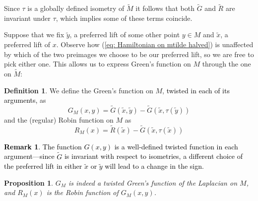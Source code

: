 \documentclass[11pt,twoside]{article}
\newtheorem{prop}[theorem]{Proposition}
\theoremstyle{definition}
\newtheorem{Def}[theorem]{Definition}
\newtheorem{rem}[theorem]{Remark}
\numberwithin{equation}{section}
\def\Mt{\widetilde{M}}
\def\Gt{\widetilde{G}}
\def\Rt{\widetilde{R}}
\def\xt{\tilde{x}}
\def\yt{\tilde{y}}
\begin{document}
Since $\tau$ is a globally defined isometry of $\Mt$ it follows that both $\Gt$ and $\Rt$ are invariant under $\tau$, which implies some of these terms coincide.

Suppose that we fix $\yt$, a preferred lift of some other  point $y\in M$ and $\xt$, a preferred lift of $x$. Observe how (\ref{eq: Hamiltonian on mtilde halved}) is unaffected by which of the two preimages we choose to be our preferred lift, so we are free to pick either one. This allows us to express Green's function on $M$ through the one on $\Mt$:
\begin{Def}
We define the Green's function on $M$, \textcolor{black}{twisted in each of its arguments,} as 
\begin{equation}
\label{eq: twisted Green}
G_M(x,y) = \Gt(\xt,\yt) -\Gt(\xt,\tau(\yt))
\end{equation}
and the (regular) Robin function on $M$ as
\begin{equation}
\label{eq: twisted Robin}
     R_M(x) = \Rt(\xt)-\Gt(\xt,\tau(\xt))
\end{equation}
\end{Def}
\textcolor{black}{\begin{rem}
 The function $G(x,y)$ is a well-defined twisted function in each argument---since $\Gt$ is invariant with respect to isometries, a different choice of the preferred lift in either $\xt$ or $\yt$ will lead to a change in the sign.
     \end{rem}}
\begin{prop}
\label{st: green function and robin function}
 $G_M$ is indeed  a twisted Green's function of the Laplacian on $M$, and $R_M(x)$ is the Robin function of $G_M(x,y)$.
\end{prop}
\end{document}
